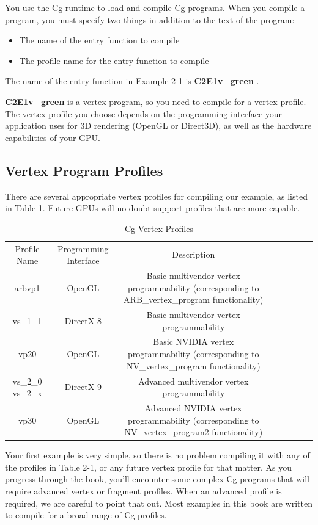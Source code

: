 \documentclass{book}
\begin{document}
You use the Cg runtime to load and compile Cg programs. When you compile a program, you must specify two things in addition to the text of the program:

\FloatBarrier
\begin{itemize}
\item The name of the entry function to compile
\item The profile name for the entry function to compile
\end{itemize}
\FloatBarrier

The name of the entry function in Example 2-1 is \textbf{C2E1v_green} .

\textbf{C2E1v_green} is a vertex program, so you need to compile for a vertex profile. The vertex profile you choose depends on the programming interface your application uses for 3D rendering (OpenGL or Direct3D), as well as the hardware capabilities of your GPU.

\subsection{Vertex Program Profiles}

There are several appropriate vertex profiles for compiling our example, as listed in Table \ref{table:2-1}. Future GPUs will no doubt support profiles that are more capable.

\begin{table}
\centering
\begin{tabular}{ |c|c|c|c|c|c|c|c| } 
 \hline
Profile Name & Programming Interface & Description \\
arbvp1 & OpenGL & Basic multivendor vertex programmability (corresponding to ARB_vertex_program functionality) \\
vs_1_1 & DirectX 8 & Basic multivendor vertex programmability \\
vp20 & OpenGL & Basic NVIDIA vertex programmability (corresponding to NV_vertex_program functionality) \\
vs_2_0 vs_2_x & DirectX 9 & Advanced multivendor vertex programmability \\
vp30 & OpenGL & Advanced NVIDIA vertex programmability (corresponding to NV_vertex_program2 functionality) \\
 \hline
\end{tabular}
\caption{Cg Vertex Profiles}
\label{table:2-1}
\end{table}

Your first example is very simple, so there is no problem compiling it with any of the profiles in Table 2-1, or any future vertex profile for that matter. As you progress through the book, you'll encounter some complex Cg programs that will require advanced vertex or fragment profiles. When an advanced profile is required, we are careful to point that out. Most examples in this book are written to compile for a broad range of Cg profiles.
\end{document}
